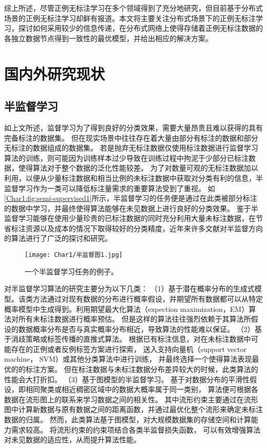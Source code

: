 综上所述，尽管正例无标注学习在多个领域得到了充分地研究，但目前基于分布式场景的正例无标注学习却鲜有报道。本文将主要关注分布式场景下的正例无标注学习，探讨如何采用较少的信息传递，在分布式网络上使得存储着正例无标注数据的各独立数据节点得到一致性的最优模型，并给出相应的解决方案。

\section{国内外研究现状}
\subsection{半监督学习}
如上文所述，监督学习为了得到良好的分类效果，需要大量昂贵且难以获得的具有完备标注的数据集。
但在现实场景中{往往存在着大量}由部分有标注的数据和部分无标注的数据组成的数据集。
若是抛弃无标注数据仅使用标注数据进行监督学习算法的训练，则可能因为训练样本过少导致在训练过程中拘泥于少部分已标注数据，使得算法对于整个数据的泛化性能较差。
为了对数量可观的无标注数据加以利用，以便从少量标注数据和相当比例的未标注数据中获取对分类有利的信息，半监督学习作为一类可以降低标注量需求的重要算法受到了重视。
如\autoref{Char1:fig:semi-supervised1}所示，半监督学习的任务便是通过在此类被部分标注的数据中学习，并最终使得算法能够在未见数据上进行良好的分类效果。
鉴于半监督学习能够在使用少量珍贵的已标注数据的同时充分利用大量未标注数据，在节省标注资源以及成本的情况下取得较好的分类精度，近年来许多文献对半监督方向的算法进行了广泛的探讨和研究。
\begin{figure}[htbp]
    \centering
    \texttt{[image: Char1/半监督图1.jpg]}
    \caption{\label{Char1:fig:semi-supervised1}一个半监督学习任务的例子。}
\end{figure}

对半监督学习算法的研究主要分为以下几类：
（1）基于潜在概率分布的生成式模型。该类方法通过对现有数据的分布进行概率假设，并期望所有数据都可以从特定概率模型中生成得到。利用期望最大化算法（expection maximization，EM）算法对所有未标注数据进行概率预估\cite{Zhang_Semi_2007,Ma_Semi_2017}。
但是这样的算法往往强烈依赖于其算法所假设的数据概率分布是否与真实概率分布相近，导致算法的性能难以保证。
（2）基于消歧策略或标签传播的直推式算法。
根据已有标注信息，对在未标注数据中可能存在的正例或者反例标签方案进行探索，
送入支持向量机（support vector machine， SVM）或其他分类算法中进行训练，
并最终选择一个使得算法表现最优的的标注方案\cite{Wang_Partial_2019, Wang_Semi-Supervised_2020,Li_Semi_2018}。
但在标注数据与未标注数据分布差异较大的时候，此类算法的性能会大打折扣。
（3）基于图模型的半监督学习。
基于对数据分布的平滑性假设，即相同聚类或相近稠密区域中的数据大概率属于同一类别，
算法便可根据各数据在流形图上的联系来学习数据之间的相关性\cite{Belkin_Manifold_2006,Huang_Semi_2014,Forestier_Semi_2016}。
其中流形约束主要通过在流形图中计算新数据与原有数据之间的距离函数，并通过最优化整个流形来确定未标注数据的归属\cite{Zhu_Manifold_2005,Zhu_Semi_2005}。
然而，此类算法基于图模型，对大规模数据集的存储空间和计算能力需求较高。
将流形约束的约束项结合各类半监督损失函数，
可以有效增强算法对未见数据的适应性，从而提升算法性能\cite{Van_SemiSurvey_2020, Dong_Semi_2016}。

